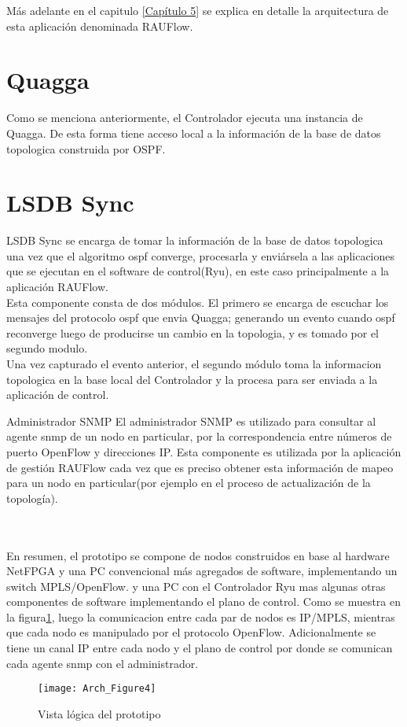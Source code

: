 M\'as adelante en el capitulo \ref{Capítulo 5} se explica en detalle la arquitectura de esta aplicación denominada RAUFlow.\\

\section{Quagga}
Como se menciona anteriormente, el Controlador ejecuta una instancia de Quagga. De esta forma tiene acceso local a la información de la base de datos topologica construida por OSPF.

\section{LSDB Sync}
LSDB Sync se encarga de tomar la información de la base de datos topologica una vez que el algoritmo ospf converge, procesarla y enviársela a las aplicaciones que se ejecutan en el software de control(Ryu), en este caso principalmente a la aplicación RAUFlow.\\

Esta componente consta de dos módulos. El primero se encarga de escuchar los mensajes del protocolo ospf que envia Quagga; generando un evento cuando ospf reconverge luego de producirse un cambio en la topologia, y es tomado por el segundo modulo.\\

Una vez capturado el evento anterior, el segundo m\'odulo toma la informacion topologica en la base local del Controlador y la procesa para ser enviada a la aplicación de control.

\begin{section}{Administrador SNMP}
El administrador SNMP es utilizado para consultar al agente snmp de un nodo en particular, por la correspondencia entre números de puerto OpenFlow y direcciones IP. Esta componente es utilizada por la aplicación de gestión RAUFlow cada vez que es preciso obtener esta información de mapeo para un nodo en particular(por ejemplo en el proceso de actualización de la topolog\'ia).\\\\\

\end{section}

En resumen, el prototipo se compone de nodos construidos en base al hardware NetFPGA y una PC convencional m\'as agregados de software, implementando un switch MPLS/OpenFlow. y una PC con el Controlador Ryu mas algunas otras componentes de software implementando el plano de control. Como se muestra en la figura\ref{fig:OpenSourceRArch4}, luego la comunicacion entre cada par de nodos es IP/MPLS, mientras que cada nodo es manipulado por el protocolo OpenFlow. Adicionalmente se tiene un canal IP entre cada nodo y el plano de control por donde se comunican cada agente snmp con el administrador.\\

\begin{figure}[htbp!] 
\centering    
\texttt{[image: Arch\_Figure4]}
\caption[OpenSourceRArch4]{Vista l\'ogica del prototipo}
\label{fig:OpenSourceRArch4}
\end{figure}